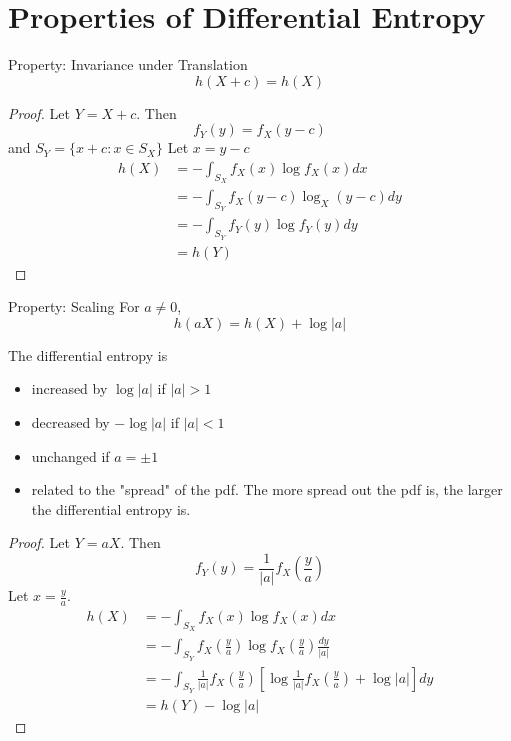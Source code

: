 \documentclass[../main.tex]{subfiles}
\begin{document}
\section{Properties of Differential Entropy}
\begin{bbox}{Property: Invariance under Translation}
    \[
    h(X+c) = h(X)
    \]    
    \begin{proof}
        Let $Y=X+c$. Then \[
        f_Y(y) = f_X(y-c)
        \] and $S_Y = \{x+c:x\in S_X\}$
        Let $x=y-c$
    \begin{align*}
        h(X) &= -\int_{S_X}f_X(x)\log f_X(x)dx\\
        &=-\int_{S_Y}f_X(y-c)\log_X(y-c)dy\\
        &=-\int_{S_Y}f_Y(y)\log f_Y(y)dy\\
        &= h(Y)
    \end{align*}
    \end{proof}
\end{bbox}
\begin{bbox}{Property: Scaling}
    For $a\neq 0$, \[
    h(aX)=h(X)+\log |a|
    \]
    \begin{remark}
    The differential entropy is 
        \begin{itemize}
            \item increased by $\log |a|$ if $|a|>1$
            \item decreased by $-\log|a|$ if $|a|<1$
            \item unchanged if $a=\pm 1$
            \item related to the "spread" of the pdf. The more spread out the pdf is, the larger the differential entropy is.
        \end{itemize}
    \end{remark}
    \begin{proof}
        Let $Y=aX$. Then\[
        f_Y(y)=\frac{1}{|a|}f_X(\frac{y}{a})
        \]
        Let $x=\frac{y}{a}$.\begin{align*}
            h(X) &= -\int_{S_X}f_X(x)\log f_X(x)dx\\
            &=-\int_{S_Y}f_X(\frac{y}{a})\log f_X(\frac{y}{a})\frac{dy}{|a|}\\
            &=-\int_{S_Y}\frac{1}{|a|}f_X(\frac{y}{a})\left[\log \frac{1}{|a|}f_X(\frac{y}{a})+\log |a|\right] dy\\
            &=h(Y) - \log|a|
        \end{align*}
    \end{proof}
\end{bbox}
\end{document}
